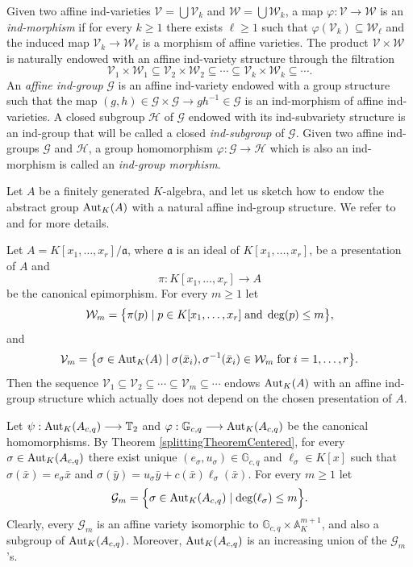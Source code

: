 \documentclass{article}
\newcommand \G {\mathbb{G}}
\newcommand \T {\mathbb{T}}
\newcommand \V {\mathcal{V}}
\newcommand \W {\mathcal{W}}
\newcommand \ca {\mathfrak{a}}
\renewcommand \a {A}
\renewcommand \k {K}
\newcommand \affine {\mathbb{A}}
\newcommand \auto {{\rm Aut}}
\begin{document}
{\smallskip Given two affine ind-varieties $\V=\bigcup \V_k$ and $\W=\bigcup\W_{k}$, a map $\varphi:\V\longrightarrow\W$ is an {\it ind-morphism} if for every $k\geq 1$ there exists $\ell\geq 1$ such that $\varphi(\V_k)\subseteq \W_{\ell}$ and the induced map $\V_k\longrightarrow\W_{\ell}$ is a morphism of affine varieties. The product $\V\times \W$ is naturally endowed with an affine ind-variety structure through the filtration $$\V_1\times \W_1\subseteq \V_2\times\W_2\subseteq \cdots \subseteq \V_k\times \W_k\subseteq \cdots.$$
An {\it affine ind-group} $\mathcal{G}$ is an affine ind-variety endowed with a group structure such that the map $(g,h)\in \mathcal{G}\times \mathcal{G}\longrightarrow gh^{-1}\in \mathcal{G}$ is an ind-morphism of affine ind-varieties. A closed subgroup $\mathcal{H}$ of $\mathcal{G}$ endowed with its ind-subvariety structure is an ind-group that will be called a closed {\it ind-subgroup} of $\mathcal{G}$. Given two affine ind-groups $\mathcal{G}$ and $\mathcal{H}$, a group homomorphism $\varphi:\mathcal{G}\longrightarrow \mathcal{H}$ which is also an ind-morphism is called an {\it ind-group morphism}.

\smallskip Let $\a$ be a finitely generated $\k$-algebra, and let us sketch how to endow the abstract group $\auto_{\k}(\a)$ with a natural affine ind-group structure. We refer to \cite[Proposition 2.1]{zaidenberg_2017} and \cite[Section 5]{furterKraft_2018} for more details.

\smallskip\noindent Let $\a=\k[x_1,\ldots,x_r]/\ca$, where $\ca$ is an ideal of $\k[x_1,\ldots,x_r]$, be a presentation of $\a$ and $$\pi:\k[x_1,\ldots,x_r]\longrightarrow\a$$ be the canonical epimorphism. For every $m\geq 1$ let
$$\W_m=\big\{\pi(p)\mid p\in\k[x_1,\ldots,x_r]\; {\rm and}\; \deg(p)\leq m \big\},$$ and
$$\mathcal{V}_m=\big\{\sigma\in\auto_{\k}(\a)\mid \sigma(\bar{x}_i), \sigma^{-1}(\bar{x}_i)\in\W_m\;{\rm for}\; i=1,\ldots,r \big\}.$$ Then the sequence $\mathcal{V}_1\subseteq \mathcal{V}_2\subseteq \cdots\subseteq \mathcal{V}_m\subseteq \cdots$ endows $\auto_{\k}(\a)$ with an affine ind-group structure which actually does not depend on the chosen presentation of $\a$.

\medskip Let $\psi:\auto_{\k}(\a_{c,q})\longrightarrow \T_2$ and $\varphi:\G_{c,q}\longrightarrow\auto_{\k}(\a_{c,q})$ be the canonical homomorphisms. By Theorem \ref{splittingTheoremCentered}, for every $\sigma\in\auto_{\k}(\a_{c,q})$ there exist unique $(e_{\sigma},u_{\sigma})\in\G_{c,q}$ and $\ell_{\sigma}\in\k[x]$ such that $\sigma(\bar{x})=e_{\sigma}\bar{x}$ and $\sigma(\bar{y})=u_{\sigma}\bar{y}+c(\bar{x})\ell_{\sigma}(\bar{x})$. For every $m\geq 1$ let
$$\mathcal{G}_m=\Big\{\sigma\in\auto_{\k}(\a_{c,q})\mid \deg(\ell_{\sigma})\leq m \Big\}.$$ Clearly, every $\mathcal{G}_m$ is an affine variety isomorphic to $\G_{c,q}\times \affine_{\k}^{m+1}$, and also a subgroup of $\auto_{\k}(\a_{c,q})$. Moreover, $\auto_{\k}(\a_{c,q})$ is an increasing union of the $\mathcal{G}_m$'s.

}
\end{document}
